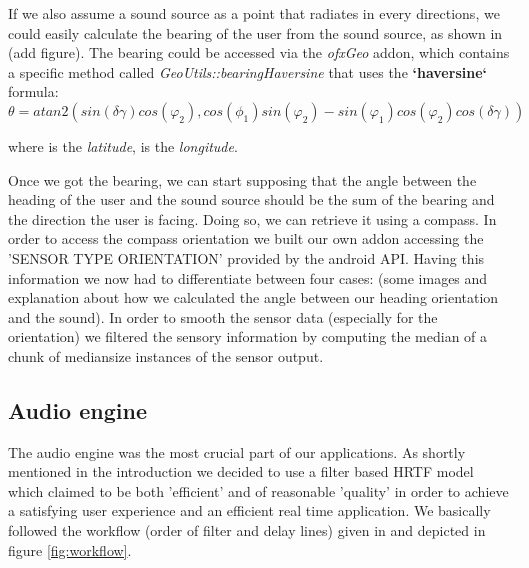 \documentclass[journal]{IEEEtran}
\begin{document}
If we also assume a sound source as a point that radiates in every directions, we could easily calculate the bearing of the user from the sound source, as shown in (add figure). The bearing could be accessed via the \emph{ofxGeo} addon, which contains a specific method called \emph{GeoUtils::bearingHaversine} that uses the \textbf{`haversine`} formula:
\begin{dmath}
\theta = atan2(sin (\delta \gamma)cos(\varphi_2), cos(\phi_1)sin(\varphi_2)-sin(\varphi_1)cos(\varphi_2)cos(\delta \gamma)) 
\end{dmath} 

where \varphi is the \emph{latitude}, \delta is the \emph{longitude}.

Once we got the bearing, we can start supposing that the angle between the heading of the user and the sound source should be the sum of the bearing and the direction the user is facing. Doing so, we can retrieve it using a compass. In order to access the compass orientation we built our own addon accessing the 'SENSOR TYPE ORIENTATION' provided by the android API. Having this information we now had to differentiate between four cases: (some images and explanation about how we calculated the angle between our heading orientation and the sound). In order to smooth the sensor data (especially for the orientation) we filtered the sensory information by computing the median of a chunk of mediansize instances of the sensor output. 

\subsection{Audio engine}
The audio engine was the most crucial part of our applications. As shortly mentioned in the introduction we decided to use a filter based HRTF model which claimed to be both 'efficient' and of reasonable 'quality' \cite{Brown1997} in order to achieve a satisfying user experience and an efficient real time application. We basically followed the workflow (order of filter and delay lines) given in \cite{Brown1997} and depicted in figure \ref{fig:workflow}. 
\end{document}

